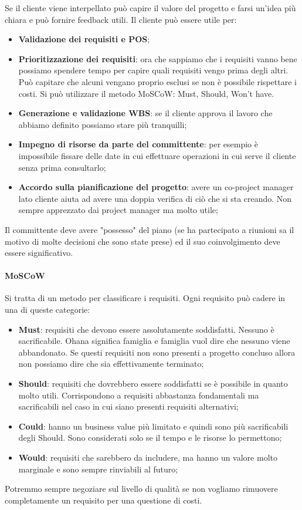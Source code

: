 \noindent Se il cliente viene interpellato può capire il valore del progetto e farsi un'idea più chiara e può fornire feedback utili.
Il cliente può essere utile per:
\begin{itemize}
	\item \textbf{Validazione dei requisiti e POS};
	\item \textbf{Prioritizzazione dei requisiti}: ora che sappiamo che i requisiti vanno bene possiamo spendere tempo per capire quali requisiti vengo prima degli altri. Può capitare che alcuni vengano proprio esclusi se non è possibile rispettare i costi. Si può utilizzare il metodo MoSCoW: Must, Should, Won't have.
	\item \textbf{Generazione e validazione WBS}: se il cliente approva il lavoro che abbiamo definito possiamo stare più tranquilli;
	\item \textbf{Impegno di risorse da parte del committente}: per esempio è impossibile fissare delle date in cui effettuare operazioni in cui serve il cliente senza prima consultarlo;
	\item \textbf{Accordo sulla pianificazione del progetto}: avere un co-project manager lato cliente aiuta ad avere una doppia verifica di ciò che si sta creando. Non sempre apprezzato dai project manager ma molto utile;
\end{itemize}
Il committente deve avere "possesso" del piano (se ha partecipato a riunioni sa il motivo di molte decisioni che sono state prese) ed il suo coinvolgimento deve essere significativo.

\paragraph{MoSCoW}
Si tratta di un metodo per classificare i requisiti. Ogni requisito può cadere in una di queste categorie:
\begin{itemize}
	\item \textbf{Must}: requisiti che devono essere assolutamente soddisfatti. Nessuno è sacrificabile. Ohana significa famiglia e famiglia vuol dire che nessuno viene abbandonato. Se questi requisiti non sono presenti a progetto concluso allora non possiamo dire che sia effettivamente terminato;
	\item \textbf{Should}: requisiti che dovrebbero essere soddisfatti se è possibile in quanto molto utili. Corrispondono a requisiti abbastanza fondamentali ma sacrificabili nel caso in cui siano presenti requisiti alternativi;
	\item \textbf{Could}: hanno un business value più limitato e quindi sono più sacrificabili degli Should. Sono considerati solo se il tempo e le risorse lo permettono;
	\item \textbf{Would}: requisiti che sarebbero da includere, ma hanno un valore molto marginale e sono sempre rinviabili al futuro;
\end{itemize}
\begin{warn}
	Potremmo sempre negoziare sul livello di qualità se non vogliamo rimuovere completamente un requisito per una questione di costi.
\end{warn}
